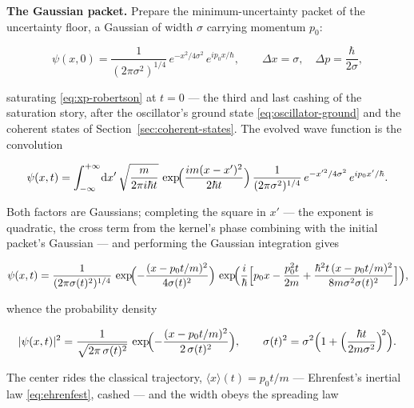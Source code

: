\medskip\noindent\textbf{The Gaussian packet.} Prepare the minimum-uncertainty packet of the uncertainty floor, a Gaussian of width $\sigma$ carrying momentum $p_0$:
\begin{linenomath}
    \begin{equation*}
        \psi(x, 0) = \frac{1}{(2\pi\sigma^2)^{1/4}}\,e^{-x^2/4\sigma^2}\,e^{ip_0 x/\hbar},
        \qquad
        \Delta x = \sigma, \quad \Delta p = \frac{\hbar}{2\sigma} ,
    \end{equation*}
\end{linenomath}
saturating \eqref{eq:xp-robertson} at $t = 0$ --- the third and last cashing of the saturation story, after the oscillator's ground state \eqref{eq:oscillator-ground} and the coherent states of Section~\ref{sec:coherent-states}. The evolved wave function is the convolution
\begin{linenomath}
    \begin{equation*}
        \psi(x, t) = \int_{-\infty}^{+\infty}\!\mathrm{d} x'\,
        \sqrt{\frac{m}{2\pi i\hbar t}}\,
        \exp\!\Bigl(\frac{im(x-x')^2}{2\hbar t}\Bigr)\,
        \frac{1}{(2\pi\sigma^2)^{1/4}}\,
        e^{-x'^2/4\sigma^2}\,e^{ip_0 x'/\hbar}.
    \end{equation*}
\end{linenomath}
Both factors are Gaussians; completing the square in $x'$ --- the exponent is quadratic, the cross term from the kernel's phase combining with the initial packet's Gaussian --- and performing the Gaussian integration gives
\begin{linenomath}
    \begin{equation*}
        \psi(x,t)=\frac{1}{(2\pi\sigma(t)^2)^{1/4}}\,
        \exp\!\Bigl(-\frac{(x-p_0 t/m)^2}{4\sigma(t)^2}\Bigr)\,
        \exp\!\Bigl(\frac{i}{\hbar}\Bigl[p_0 x-\frac{p_0^2 t}{2m}
        +\frac{\hbar^2 t\,(x-p_0 t/m)^2}{8m\sigma^2\sigma(t)^2}\Bigr]\Bigr),
    \end{equation*}
\end{linenomath}
whence the probability density
\begin{linenomath}
    \begin{equation*}
        |\psi(x, t)|^2 = \frac{1}{\sqrt{2\pi\,\sigma(t)^2}}\,\exp\!\Bigl(-\frac{(x - p_0 t/m)^2}{2\,\sigma(t)^2}\Bigr),
        \qquad
        \sigma(t)^2 = \sigma^2\Bigl(1 + \Bigl(\frac{\hbar t}{2m\sigma^2}\Bigr)^{\!2}\Bigr) .
    \end{equation*}
\end{linenomath}
The center rides the classical trajectory, $\langle x\rangle(t) = p_0 t/m$ --- Ehrenfest's inertial law \eqref{eq:ehrenfest}, cashed --- and the width obeys the spreading law
